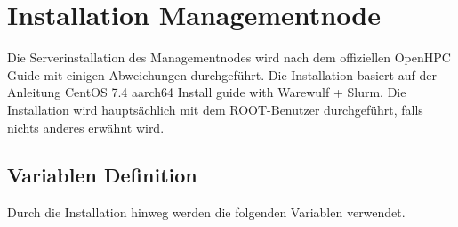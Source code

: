 
\section{Installation Managementnode}
Die Serverinstallation des Managementnodes wird nach dem offiziellen OpenHPC Guide mit einigen Abweichungen durchgeführt. Die Installation basiert auf der Anleitung CentOS 7.4 aarch64 Install guide with Warewulf + Slurm. Die Installation wird hauptsächlich mit dem ROOT-Benutzer durchgeführt, falls nichts anderes erwähnt wird.

\subsection{Variablen Definition}
Durch die Installation hinweg werden die folgenden Variablen verwendet.

